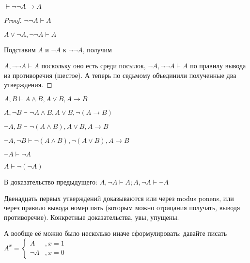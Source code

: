 
\begin{statement}
    $\vdash \lnot \lnot A \to A$
\end{statement}
\begin{proof}
    $\lnot \lnot A \vdash A$

    $A \lor \lnot A, \lnot \lnot A \vdash A$

    Подставим $A$ и $\lnot A$ к $\lnot \lnot A$, получим

    $A, \lnot \lnot A \vdash A$ поскольку оно есть среди посылок, $\lnot A, \lnot \lnot A \vdash A$ по правилу вывода из противоречия (шестое).  А теперь по седьмому объединили полученные два утверждения.
\end{proof}

\begin{lemma}
	$A, B \vdash A \land B, A \lor B, A \to B$

	$A, \lnot B \vdash \lnot A \land B, A \lor B, \lnot (A \to B)$

	$\lnot A, B \vdash \lnot(A \land B), A \lor B, A \to B$

	$\lnot A, \lnot B \vdash \lnot(A \land B), \lnot(A \lor B), A \to B$

	$\lnot A \vdash \lnot A$

	$A \vdash \lnot(\lnot A)$

	В доказательство предыдущего: $A, \lnot A \vdash A; A, \lnot A \vdash \lnot A$

	Двенадцать первых утверждений доказываются или через modus ponens, или через правило вывода номер пять (которым можно отрицания получать, выводя противоречие). Конкретные доказательства, увы, упущены.
\end{lemma}

А вообще её можно было несколько иначе сформулировать: давайте писать $A^x = \left\{\begin{aligned} A &, x = 1\\ \lnot A &, x = 0  \end{aligned} \right.$

